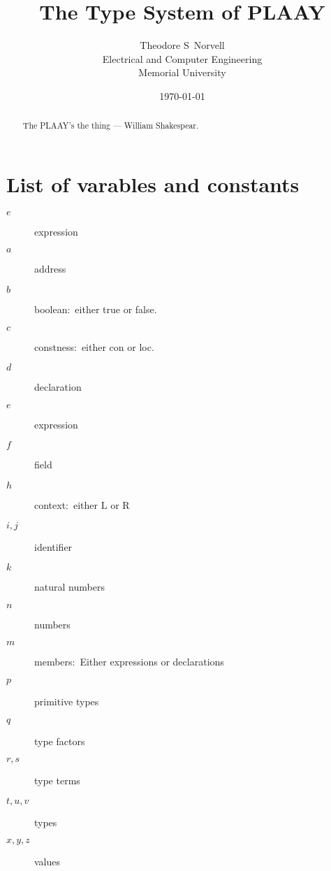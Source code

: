 \documentclass[12pt]{article}
\begin{document}
\title{The Type System of PLAAY}
\author{Theodore S\ Norvell \\
Electrical and Computer Engineering\\
Memorial University}
\date{\today}
\maketitle

\begin{abstract}
The PLAAY's the thing --- William Shakespear.
\end{abstract}

\tableofcontents

\section*{List of varables and constants}%

\begin{description}
\item[$e$] expression

\item[$a$] address

\item[$b$] boolean:\ either \textsf{true} or \textsf{false}.

\item[$c$] constness:\ either \textsf{con} or \textsf{loc}.

\item[$d$] declaration

\item[$e$] expression

\item[$f$] field

\item[$h$] context:\ either $\mathrm{L}$ or $\mathrm{R}$

\item[$i,j$] identifier

\item[$k$] natural numbers

\item[$n$] numbers

\item[$m$] members:\ Either expressions or declarations

\item[$p$] primitive types

\item[$q$] type factors

\item[$r,s$] type terms

\item[$t,u,v$] types

\item[$x,y,z$] values
\end{description}
\end{document}
